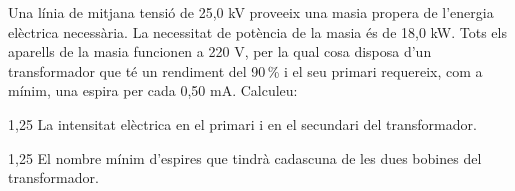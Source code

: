 Una línia de mitjana tensió de 25,0 kV proveeix una masia propera de l'energia elèctrica necessària. La necessitat de potència de la masia és de 18,0 kW. Tots els aparells de la masia funcionen a 220 V, per la qual cosa disposa d'un transformador que té un rendiment del 90\,\% i el seu primari requereix, com a mínim, una espira per cada 0,50 mA. Calculeu:

\begin{apartat}{1,25}
La intensitat elèctrica en el primari i en el secundari del transformador.
\end{apartat}

\begin{apartat}{1,25}
El nombre mínim d'espires que tindrà cadascuna de les dues bobines del transformador.
\end{apartat}
